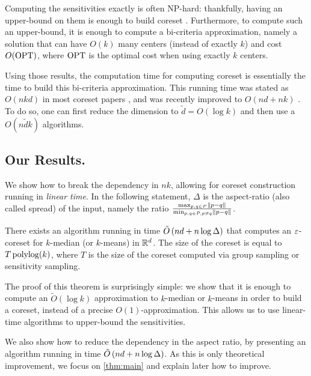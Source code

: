 Computing the sensitivities exactly is often NP-hard: thankfully, having an upper-bound on them is enough to build coreset \cite{}. Furthermore, to compute such an upper-bound, it is enough to compute a bi-criteria approximation, namely a solution that can have $O(k)$ many centers (instead of exactly $k$) and cost $O(\text{OPT})$, where $\text{OPT}$ is the optimal cost when using exactly $k$ centers. 

Using those results, the computation time for computing coreset is essentially the time to build this bi-criteria approximation. 
This running time was stated as $O(nkd)$ in most coreset papers \cite{}, and was recently improved to $O(nd + nk)$ \cite{}. To do so, one can first reduce the dimension to $\tilde d = O(\log k)$ and then use a $O(n \tilde d k)$ algorithms. 

\subsection{Our Results.}

We show how to break the dependency in $nk$, allowing for coreset construction running in \textit{linear time}. In the following statement, $\Delta$ is the aspect-ratio (also called spread) of the input, namely the ratio $\frac{\max_{p, q \in P} \left\| p-q\right\|}{\min_{p, q \in P, p \neq q} \left\| p-q\right\|}$.

\begin{theorem}\label{thm:main}
There exists an algorithm running in time $\tilde O\left( nd + n \log \Delta\right)$  that computes an $\varepsilon$-coreset for $k$-median (or $k$-means) in $\mathbb{R}^d$. The size of the coreset is equal to $T \operatorname{polylog}(k)$, where $T$ is the size of the coreset computed via group sampling or sensitivity sampling.
\end{theorem}

The proof of this theorem is surprisingly simple: we show that it is enough to compute an $\tilde O(\log k)$ approximation to $k$-median or $k$-means in order to build a coreset, instead of a precise $O(1)$-approximation. This allows us to use linear-time algorithms to upper-bound the sensitivities.

We also show how to reduce the dependency in the aspect ratio, by presenting an algorithm running in time $\tilde O\left( nd + n \log \Delta\right)$. As this is only theoretical improvement, we focus on \cref{thm:main} and explain later how to improve.

